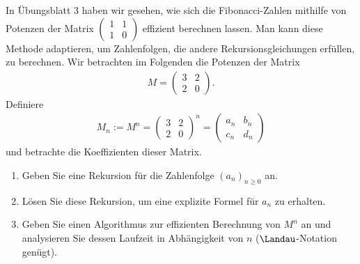\begin{exercise}
In Übungsblatt 3 haben wir gesehen, wie sich die Fibonacci-Zahlen mithilfe von
Potenzen der Matrix $\begin{pmatrix}1 & 1 \\ 1 & 0\end{pmatrix}$ effizient berechnen
lassen. Man kann diese Methode adaptieren, um Zahlenfolgen, die andere Rekursionsgleichungen
erfüllen, zu berechnen. Wir betrachten im Folgenden die Potenzen der Matrix
\begin{align*}
  M = \begin{pmatrix}
    3 & 2 \\ 2 & 0
  \end{pmatrix}.
\end{align*}
Definiere
\begin{align*}
  M_n := M^n = \begin{pmatrix}3 & 2 \\ 2 & 0\end{pmatrix}^n
  = \begin{pmatrix}a_n & b_n \\ c_n & d_n\end{pmatrix}
\end{align*}
und betrachte die Koeffizienten dieser Matrix.
\begin{enumerate}[label = \alph*)]
  \item Geben Sie eine Rekursion für die Zahlenfolge $(a_n)_{n \geq 0}$ an.
  \item Lösen Sie diese Rekursion, um eine explizite Formel für $a_n$ zu erhalten.
  \item Geben Sie einen Algorithmus zur effizienten Berechnung von $M^n$ an
  und analysieren Sie dessen Laufzeit in Abhängigkeit von $n$ ($\Landau$-Notation genügt).
\end{enumerate}
\end{exercise}


